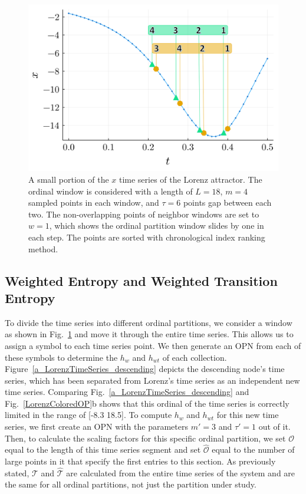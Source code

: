 \documentclass[%
 aip,
 amsmath,amssymb,
 reprint,%
]{revtex4-1}
\begin{document}
\begin{figure}[htbp]
\centerline{\includegraphics[width=\linewidth]{LorenzTimeSeries_SampleOP.png}}
\caption{A small portion of the $x$ time series of the Lorenz attractor. The ordinal window is considered with a length of $L = 18$, $m = 4$ sampled points in each window, and $\tau=6$ points gap between each two. The non-overlapping points of neighbor windows are set to $w = 1$, which shows the ordinal partition window slides by one in each step. The points are sorted with chronological index ranking method.}
\label{LorenzTimeSeries_SampleOP}
\end{figure}

\subsection{\label{sec:Weighted Entropy and Weighted Transition Entropy}Weighted Entropy and Weighted Transition Entropy}

To divide the time series into different ordinal partitions, we consider a window as shown in Fig.~\ref{LorenzTimeSeries_SampleOP} and move it through the entire time series. This allows us to assign a symbol to each time series point. We then generate an OPN from each of these symbols to determine the $h_w$ and $h_{wt}$ of each collection. 
Figure~\ref{a_LorenzTimeSeries_descending} depicts the descending node's time series, which has been separated from Lorenz's time series as an independent new time series. Comparing Fig.~\ref{a_LorenzTimeSeries_descending} and Fig.~\ref{LorenzColoredOP}b shows that this ordinal of the time series is correctly limited in the range of [-8.3 18.5]. To compute $h_w$ and $h_{wt}$ for this new time series, we first create an OPN with the parameters $m' = 3$ and $\tau' = 1$ out of it. Then, to calculate the scaling factors for this specific ordinal partition, we set $\mathcal{O}$ equal to the length of this time series segment and set $\hat{\mathcal{O}}$ equal to the number of large points in it that specify the first entries to this section. As previously stated, $\mathcal{T}$ and $\hat{\mathcal{T}}$ are calculated from the entire time series of the system and are the same for all ordinal partitions, not just the partition under study.
\end{document}
